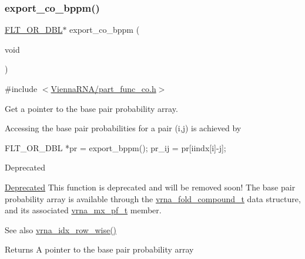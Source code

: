\subsubsection{\texorpdfstring{export\_co\_bppm()}{export\_co\_bppm()}}
{\footnotesize\ttfamily \mbox{\hyperlink{group__data__structures_ga31125aeace516926bf7f251f759b6126}{F\+L\+T\+\_\+\+O\+R\+\_\+\+D\+BL}}$\ast$ export\+\_\+co\+\_\+bppm (\begin{DoxyParamCaption}\item[{void}]{ }\end{DoxyParamCaption})}



{\ttfamily \#include $<$\mbox{\hyperlink{part__func__co_8h}{Vienna\+R\+N\+A/part\+\_\+func\+\_\+co.\+h}}$>$}



Get a pointer to the base pair probability array. 

Accessing the base pair probabilities for a pair (i,j) is achieved by \begin{DoxyVerb}FLT_OR_DBL *pr = export_bppm(); pr_ij = pr[iindx[i]-j]; \end{DoxyVerb}


\begin{DoxyRefDesc}{Deprecated}
\item[\mbox{\hyperlink{deprecated__deprecated000117}{Deprecated}}]This function is deprecated and will be removed soon! The base pair probability array is available through the \mbox{\hyperlink{group__fold__compound_ga1b0cef17fd40466cef5968eaeeff6166}{vrna\+\_\+fold\+\_\+compound\+\_\+t}} data structure, and its associated \mbox{\hyperlink{group__dp__matrices_ga68729ab3fed26bdd1806fa814f172fc1}{vrna\+\_\+mx\+\_\+pf\+\_\+t}} member.\end{DoxyRefDesc}


\begin{DoxySeeAlso}{See also}
\mbox{\hyperlink{group__utils_ga70b180e9ea764218a82647a1cd347445}{vrna\+\_\+idx\+\_\+row\+\_\+wise()}} 
\end{DoxySeeAlso}
\begin{DoxyReturn}{Returns}
A pointer to the base pair probability array 
\end{DoxyReturn}
\mbox{\label{group__part__func__global__deprecated_gade3ce34ae8214811374b1d28a40dc247}} 
